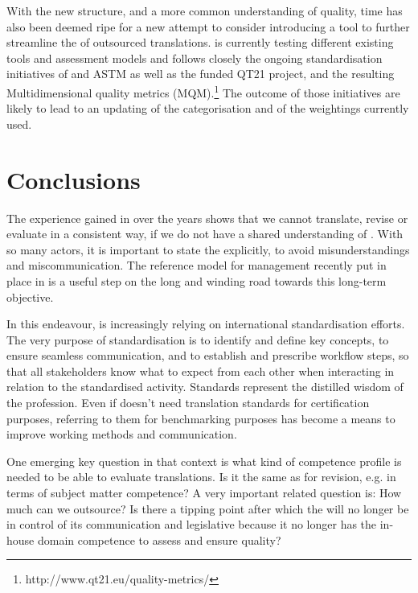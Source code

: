 \documentclass[output=paper]{langsci/langscibook}
\begin{document}
With the new  structure, and a more common understanding of quality, time has also been deemed ripe for a new attempt to consider introducing a tool to further streamline the  of outsourced translations. \citeauthor{DGT2016a} is currently testing different existing tools and assessment models and follows closely the ongoing standardisation initiatives of  and ASTM as well as the  funded QT21 project, and the resulting Multidimensional quality metrics (MQM).\footnote{http://www.qt21.eu/quality-metrics/} The outcome of those initiatives are likely to lead to an updating of the  categorisation and of the weightings currently used.

\section{Conclusions}\label{sec:strandvik:7}
\largerpage
The experience gained in \citeauthor{DGT2016a} over the years shows that we cannot translate, revise or evaluate  in a consistent way, if we do not have a shared understanding of . With so many actors, it is important to state the  explicitly, to avoid misunderstandings and miscommunication. The reference model for  management recently put in place in  is a useful step on the long and winding road towards this long-term objective. 

In this endeavour, \citeauthor{DGT2016a} is increasingly relying on international standardisation efforts. The very purpose of standardisation is to identify and define key concepts, to ensure seamless communication, and to establish and prescribe workflow steps, so that all stakeholders know what to expect from each other when interacting in relation to the standardised activity. Standards represent the distilled wisdom of the profession. Even if  doesn't need translation standards for certification purposes, referring to them for benchmarking purposes has become a means to improve working methods and communication. 

One emerging key question in that context is what kind of competence profile is needed to be able to evaluate translations. Is it the same as for revision, e.g. in terms of subject matter competence? A very important related question is: How much can we outsource? Is there a tipping point after which the  will no longer be in control of its communication and legislative  because it no longer has the in-house domain competence to assess and ensure quality? 
\end{document}
